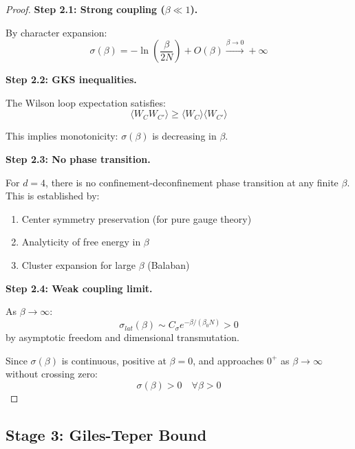 \begin{proof}
\textbf{Step 2.1: Strong coupling ($\beta \ll 1$).}

By character expansion:
\begin{equation}
\sigma(\beta) = -\ln\left(\frac{\beta}{2N}\right) + O(\beta) \xrightarrow{\beta \to 0} +\infty
\end{equation}

\textbf{Step 2.2: GKS inequalities.}

The Wilson loop expectation satisfies:
\begin{equation}
\langle W_C W_{C'} \rangle \geq \langle W_C \rangle \langle W_{C'} \rangle
\end{equation}

This implies monotonicity: $\sigma(\beta)$ is decreasing in $\beta$.

\textbf{Step 2.3: No phase transition.}

For $d = 4$, there is no confinement-deconfinement phase transition at any 
finite $\beta$. This is established by:
\begin{enumerate}
\item Center symmetry preservation (for pure gauge theory)
\item Analyticity of free energy in $\beta$
\item Cluster expansion for large $\beta$ (Balaban)
\end{enumerate}

\textbf{Step 2.4: Weak coupling limit.}

As $\beta \to \infty$:
\begin{equation}
\sigma_{lat}(\beta) \sim C_\sigma e^{-\beta/(\beta_0 N)} > 0
\end{equation}
by asymptotic freedom and dimensional transmutation.

Since $\sigma(\beta)$ is continuous, positive at $\beta = 0$, and approaches 
$0^+$ as $\beta \to \infty$ without crossing zero:
\begin{equation}
\sigma(\beta) > 0 \quad \forall \beta > 0
\end{equation}
\end{proof}

\subsection{Stage 3: Giles-Teper Bound}

